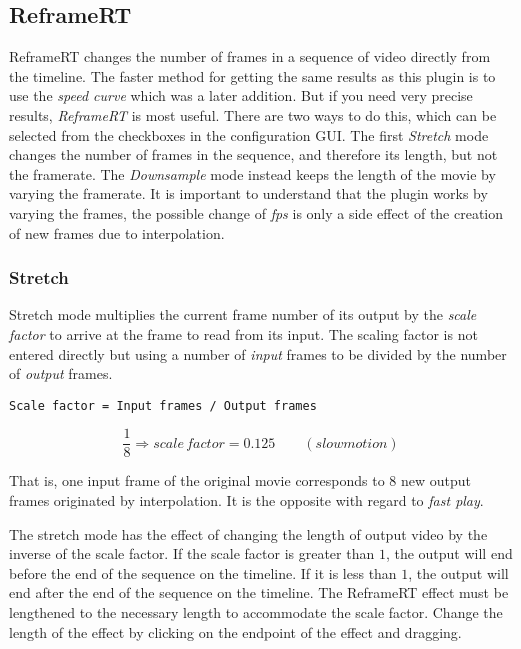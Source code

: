 \subsection{ReframeRT}%
\label{sub:reframert}

ReframeRT changes the number of frames in a sequence of video
directly from the timeline. The faster method for getting the same
results as this plugin is to use the \textit{speed curve} which was
a later addition. But if you need very precise results,
\textit{ReframeRT} is most useful. There are two ways to do this,
which can be selected from the checkboxes in the configuration
GUI\@. The first \textit{Stretch} mode changes the number of frames in
the sequence, and therefore its length, but not the framerate. The
\textit{Downsample} mode instead keeps the length of the movie by
varying the framerate.  It is important to understand that the
plugin works by varying the frames, the possible change of
\textit{fps} is only a side effect of the creation of new frames due
to interpolation.

\subsubsection*{Stretch}%
\label{ssub:stretch}

Stretch mode multiplies the current frame number of its output by the \textit{scale factor} to arrive at the frame to read from its input. The scaling factor is not entered directly but using a number of \textit{input} frames to be divided by the number of \textit{output} frames.

\vspace{1ex} \texttt{Scale factor = Input frames / Output frames}

\[\frac{1}{8} \Rightarrow scale\, factor = 0.125 \qquad (slowmotion)\]

That is, one input frame of the original movie corresponds to $8$ new output frames originated by interpolation. It is the opposite with regard to \textit{fast play}.

The stretch mode has the effect of changing the length of output video by the inverse of the scale factor. If the scale factor is greater than $1$, the output will end before the end of the sequence on the timeline. If it is less than $1$, the output will end after the end of the sequence on the timeline. The ReframeRT effect must be lengthened to the necessary length to accommodate the scale factor. Change the length of the effect by clicking on the endpoint of the effect and dragging.

